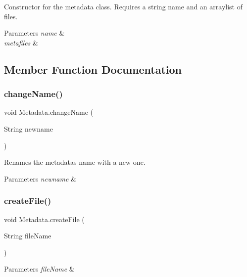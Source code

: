 Constructor for the metadata class. Requires a string name and an arraylist of files. 
\begin{DoxyParams}{Parameters}
{\em name} & \\
\hline
{\em metafiles} & \\
\hline
\end{DoxyParams}


\subsection{Member Function Documentation}
\mbox{\label{class_metadata_ad82a2024da7159b62b4baaf431c986e6}} 
\subsubsection{\texorpdfstring{change\+Name()}{changeName()}}
{\footnotesize\ttfamily void Metadata.\+change\+Name (\begin{DoxyParamCaption}\item[{String}]{newname }\end{DoxyParamCaption})\hspace{0.3cm}{\ttfamily [inline]}}

Renames the metadata\textquotesingle{}s name with a new one. 
\begin{DoxyParams}{Parameters}
{\em newname} & \\
\hline
\end{DoxyParams}
\mbox{\label{class_metadata_a67800e2f003cabb15744b86bec38a783}} 
\subsubsection{\texorpdfstring{create\+File()}{createFile()}}
{\footnotesize\ttfamily void Metadata.\+create\+File (\begin{DoxyParamCaption}\item[{String}]{file\+Name }\end{DoxyParamCaption})\hspace{0.3cm}{\ttfamily [inline]}}


\begin{DoxyParams}{Parameters}
{\em file\+Name} & \\
\hline
\end{DoxyParams}
\mbox{\label{class_metadata_ae29cb4e7e73fdda5a3649e085863d481}} 
